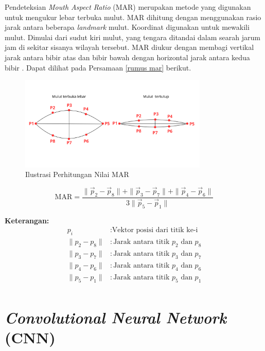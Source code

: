 Pendeteksian \textit{Mouth Aspect Ratio} (MAR) merupakan metode yang digunakan untuk mengukur lebar terbuka mulut. MAR dihitung dengan menggunakan rasio jarak antara beberapa \textit{landmark} mulut. Koordinat digunakan untuk mewakili mulut. Dimulai dari
sudut kiri mulut, yang tengara ditandai dalam searah jarum jam di sekitar sisanya
wilayah tersebut. MAR diukur dengan membagi vertikal jarak antara bibir atas dan bibir bawah dengan horizontal jarak antara kedua bibir \cite{inproceedings, jimaging9050091}. Dapat dilihat pada Persamaan \ref{rumus mar} berikut.


    \begin{figure}[H]
      \centering
      \includegraphics[width=0.8\textwidth]{figures/bab2/mar.png}
      \caption{Ilustrasi Perhitungan Nilai MAR}
      \label{Ilustrasi Perhitungan Nilai MAR}
    \end{figure}

     \begin{equation}
    \label{rumus mar}
    \text{MAR} = \frac{\| \vec{p}_2 - \vec{p}_8 \| + \| \vec{p}_3 - \vec{p}_7 \| + \| \vec{p}_4 - \vec{p}_6 \| }{3 \| \vec{p}_5 - \vec{p}_1 \|}
\end{equation}


      \textbf{Keterangan:}
    \begin{align*}
         p_i & : \text{Vektor posisi dari titik ke-i}\\
        \|p_2 - p_8\| & : \text{Jarak antara titik $p_2$ dan $p_8$}\\
        \|p_3 - p_7\| & : \text{Jarak antara titik $p_3$ dan $p_7$}\\
        \|p_4 - p_6\| & : \text{Jarak antara titik $p_4$ dan $p_6$}\\
        \|p_5 - p_1\| & : \text{Jarak antara titik $p_5$ dan $p_1$}\\
    \end{align*}


    

\section{\textit{Convolutional Neural Network} (CNN)}


